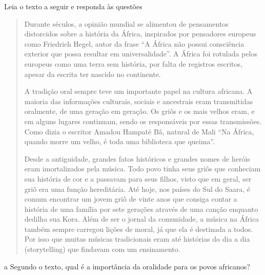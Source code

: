 
Leia o texto a seguir e responda às questões


\begin{quote}
Durante séculos, a opinião mundial se alimentou de pensamentos
distorcidos sobre a história da África, inspirados por pensadores
europeus como Friedrich Hegel, autor da frase ``A África não possui
consciência exterior que possa resultar em universalidade''. A África
foi rotulada pelos europeus como uma terra sem história, por falta de
registros escritos, apesar da escrita ter nascido no continente.

A tradição oral sempre teve um importante papel na cultura africana. A
maioria das informações culturais, sociais e ancestrais eram
transmitidas oralmente, de uma geração em geração. Os griôs e os mais
velhos eram, e em alguns lugares continuam, sendo os responsáveis por
essas transmissões. Como dizia o escritor Amadou Hampaté Bâ, natural de
Mali ``Na África, quando morre um velho, é toda uma biblioteca que
queima''.

Desde a antiguidade, grandes fatos históricos e grandes nomes de heróis
eram imortalizados pela música. Todo povo tinha seus griôs que conheciam
sua história de cor e a passavam para seus filhos, visto que em geral,
ser griô era uma função hereditária. Até hoje, nos países do Sul do
Saara, é comum encontrar um jovem griô de vinte anos que consiga contar
a história de uma família por sete gerações através de uma canção
enquanto dedilha sua Kora. Além de ser o jornal da comunidade, a música
na África também sempre carregou lições de moral, já que ela é destinada
a todos. Por isso que muitas músicas tradicionais eram até histórias do
dia a dia (storytelling) que findavam com um ensinamento.
\end{quote}

\num{a} Segundo o texto, qual é a importância da oralidade para os povos africanos?


